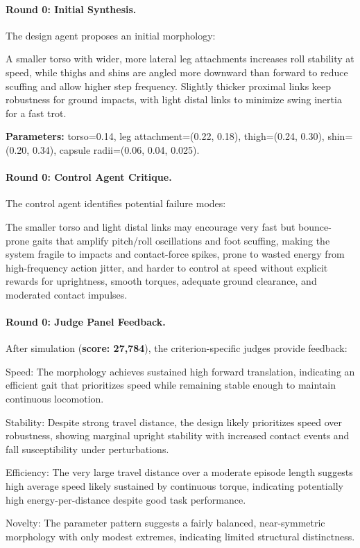 \paragraph{Round 0: Initial Synthesis.}
The design agent proposes an initial morphology:

\begin{promptbox}
A smaller torso with wider, more lateral leg attachments increases roll stability at speed, while thighs and shins are angled more downward than forward to reduce scuffing and allow higher step frequency. Slightly thicker proximal links keep robustness for ground impacts, with light distal links to minimize swing inertia for a fast trot.
\end{promptbox}

\noindent\textbf{Parameters:} torso=0.14, leg attachment=(0.22, 0.18), thigh=(0.24, 0.30), shin=(0.20, 0.34), capsule radii=(0.06, 0.04, 0.025).

\paragraph{Round 0: Control Agent Critique.}
The control agent identifies potential failure modes:

\begin{promptbox}
The smaller torso and light distal links may encourage very fast but bounce-prone gaits that amplify pitch/roll oscillations and foot scuffing, making the system fragile to impacts and contact-force spikes, prone to wasted energy from high-frequency action jitter, and harder to control at speed without explicit rewards for uprightness, smooth torques, adequate ground clearance, and moderated contact impulses.
\end{promptbox}

\paragraph{Round 0: Judge Panel Feedback.}
After simulation (\textbf{score: 27,784}), the criterion-specific judges provide feedback:

\begin{promptbox}
Speed: The morphology achieves sustained high forward translation, indicating an efficient gait that prioritizes speed while remaining stable enough to maintain continuous locomotion.

Stability: Despite strong travel distance, the design likely prioritizes speed over robustness, showing marginal upright stability with increased contact events and fall susceptibility under perturbations.

Efficiency: The very large travel distance over a moderate episode length suggests high average speed likely sustained by continuous torque, indicating potentially high energy-per-distance despite good task performance.

Novelty: The parameter pattern suggests a fairly balanced, near-symmetric morphology with only modest extremes, indicating limited structural distinctness.
\end{promptbox}

